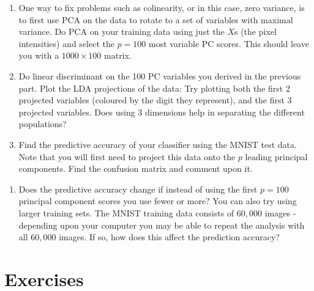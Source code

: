 \documentclass[
]{book}
\newenvironment{Shaded}{\begin{snugshade}}{\end{snugshade}}
\newcommand{\FunctionTok}[1]{\textcolor[rgb]{0.13,0.29,0.53}{\textbf{#1}}}
\newcommand{\NormalTok}[1]{#1}
\newcommand{\OtherTok}[1]{\textcolor[rgb]{0.56,0.35,0.01}{#1}}
\newcommand{\SpecialCharTok}[1]{\textcolor[rgb]{0.81,0.36,0.00}{\textbf{#1}}}
\providecommand{\tightlist}{%
  \setlength{\itemsep}{0pt}\setlength{\parskip}{0pt}}
\theoremstyle{definition}
\theoremstyle{definition}
\theoremstyle{definition}
\theoremstyle{definition}
\theoremstyle{remark}
\begin{document}
\begin{enumerate}
\def\labelenumi{\roman{enumi}.}
\setcounter{enumi}{1}
\item
  One way to fix problems such as colinearity, or in this case, zero variance, is to first use PCA on the data to rotate to a set of variables with maximal variance. Do PCA on your training data using just the \(X\)s (the pixel intensities) and select the \(p=100\) most variable PC scores. This should leave you with a \(1000 \times 100\) matrix.
\item
  Do linear discriminant on the 100 PC variables you derived in the previous part. Plot the LDA projections of the data: Try plotting both the first 2 projected variables (coloured by the digit they represent), and the first 3 projected variables.
  Does using 3 dimensions help in separating the different populations?
\item
  Find the predictive accuracy of your classifier using the MNIST test data. Note that you will first need to project this data onto the \(p\) leading principal components. Find the confusion matrix and comment upon it.
\end{enumerate}

\begin{Shaded}
\end{Shaded}

\begin{enumerate}
\def\labelenumi{\alph{enumi}.}
\setcounter{enumi}{21}
\tightlist
\item
  Does the predictive accuracy change if instead of using the first \(p=100\) principal component scores you use fewer or more? You can also try using larger training sets. The MNIST training data consists of \(60,000\) images - depending upon your computer you may be able to repeat the analysis with all \(60,000\) images. If so, how does this affect the prediction accuracy?
\end{enumerate}

\hypertarget{exercises-5}{%
\section{Exercises}\label{exercises-5}}
\end{document}
